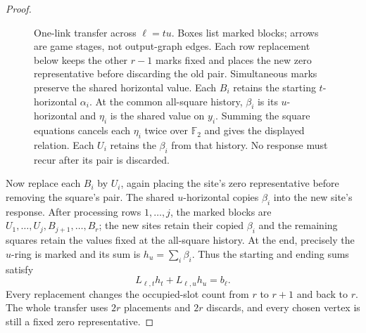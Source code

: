 \documentclass[11pt]{article}
\theoremstyle{definition}
\newcommand{\F}{\mathbb F_2}
\begin{document}
\begin{proof}
\begin{figure}[htbp]
\caption{One-link transfer across \(\ell=tu\). Boxes list marked blocks;
arrows are game stages, not output-graph edges. Each row replacement below
keeps the other \(r-1\) marks fixed and places the new zero representative
before discarding the old pair. Simultaneous marks preserve the shared
horizontal value. Each \(B_i\) retains the starting \(t\)-horizontal
\(\alpha_i\). At the common all-square history, \(\beta_i\) is its
\(u\)-horizontal and \(\eta_i\) is the shared value on \(y_i\).
Summing the square equations cancels each \(\eta_i\) twice over \(\F\)
and gives the displayed relation. Each \(U_i\) retains the \(\beta_i\)
from that history. No response must recur after its pair is discarded.}
\label{uniform:fig-ring-transfer}
\end{figure}


Now replace each $B_i$ by $U_i$, again placing the site's zero
representative before removing the square's pair.  The shared
$u$-horizontal copies $\beta_i$ into the new site's response.  After
processing rows $1,\ldots,j$, the marked blocks are
$U_1,\ldots,U_j,B_{j+1},\ldots,B_r$; the new sites retain their copied
$\beta_i$ and the remaining squares retain the values fixed at the
all-square history.  At the end, precisely the $u$-ring is marked and its
sum is $h_u=\sum_i\beta_i$.  Thus the starting and ending sums satisfy
\begin{equation}
\label{uniform:attained-link}
 L_{\ell,t}h_t+L_{\ell,u}h_u=b_\ell.
\end{equation}
Every replacement changes the occupied-slot count from $r$ to $r+1$ and
back to $r$.  The whole transfer uses $2r$ placements and $2r$ discards,
and every chosen vertex is still a fixed zero representative.


\end{proof}
\end{document}
